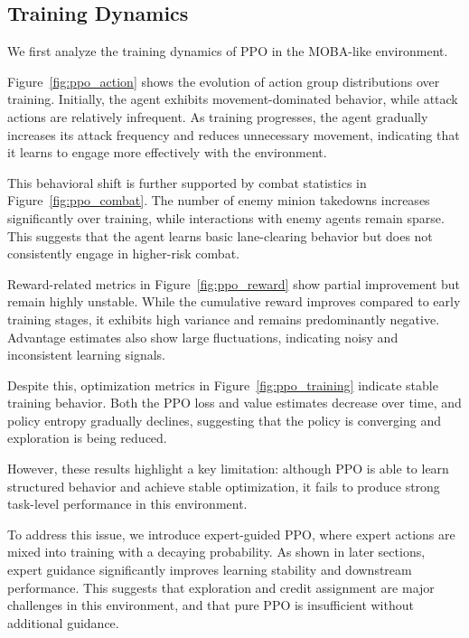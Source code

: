 \documentclass{article}
\begin{document}
\subsection{Training Dynamics}

We first analyze the training dynamics of PPO in the MOBA-like environment.

Figure~\ref{fig:ppo_action} shows the evolution of action group distributions over training. 
Initially, the agent exhibits movement-dominated behavior, while attack actions are relatively infrequent. 
As training progresses, the agent gradually increases its attack frequency and reduces unnecessary movement, 
indicating that it learns to engage more effectively with the environment.

This behavioral shift is further supported by combat statistics in Figure~\ref{fig:ppo_combat}. 
The number of enemy minion takedowns increases significantly over training, 
while interactions with enemy agents remain sparse. 
This suggests that the agent learns basic lane-clearing behavior but does not consistently engage in higher-risk combat.

Reward-related metrics in Figure~\ref{fig:ppo_reward} show partial improvement but remain highly unstable. 
While the cumulative reward improves compared to early training stages, 
it exhibits high variance and remains predominantly negative. 
Advantage estimates also show large fluctuations, indicating noisy and inconsistent learning signals.

Despite this, optimization metrics in Figure~\ref{fig:ppo_training} indicate stable training behavior. 
Both the PPO loss and value estimates decrease over time, 
and policy entropy gradually declines, suggesting that the policy is converging and exploration is being reduced.

However, these results highlight a key limitation: 
although PPO is able to learn structured behavior and achieve stable optimization, 
it fails to produce strong task-level performance in this environment.

To address this issue, we introduce expert-guided PPO, where expert actions are mixed into training with a decaying probability. 
As shown in later sections, expert guidance significantly improves learning stability and downstream performance. 
This suggests that exploration and credit assignment are major challenges in this environment, 
and that pure PPO is insufficient without additional guidance.
\end{document}
